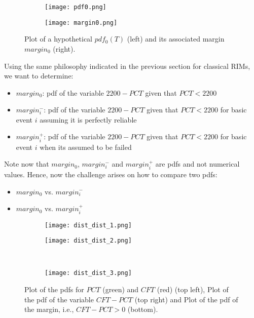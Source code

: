 \begin{figure}
  \centering
  \begin{subfigure}{.5\textwidth}
    \centering
    \centerline{\texttt{[image: pdf0.png]}}
  \end{subfigure}%
  \begin{subfigure}{.5\textwidth}
    \centering
    \centerline{\texttt{[image: margin0.png]}}
  \end{subfigure}
  \caption{Plot of a hypothetical $pdf_0(T)$ (left) and its associated margin $margin_0$ (right).}
  \label{fig:margin0}
\end{figure}
 
Using the same philosophy indicated in the previous section for classical RIMs, we want 
to determine:
\begin{itemize}
  \item $margin_0$: pdf of the variable $2200-PCT$ given that $PCT<2200$
  \item $margin_i^-$: pdf of the variable $2200-PCT$ given that $PCT<2200$ for basic 
                      event $i$ assuming it is perfectly reliable
  \item $margin_i^+$: pdf of the variable $2200-PCT$ given that $PCT<2200$ for basic event 
                      $i$ when its assumed to be failed
\end{itemize}

Note now that $margin_0$, $margin_i^-$ and $margin_i^+$ are pdfs and not numerical values. 
Hence, now the challenge arises on how to compare two pdfs:
\begin{itemize}
  \item $margin_0$ vs. $margin_i^-$
  \item $margin_0$ vs. $margin_i^+$
\end{itemize}

\begin{figure}
  \begin{subfigure}{.5\linewidth}
  \centering
  \texttt{[image: dist\_dist\_1.png]}
  \end{subfigure}%
  \begin{subfigure}{.5\linewidth}
  \centering
  \texttt{[image: dist\_dist\_2.png]}
  \end{subfigure}\\[1ex]
  \begin{subfigure}{\linewidth}
  \centering
  \texttt{[image: dist\_dist\_3.png]}
  \end{subfigure}
  \caption{Plot of the pdfs for $PCT$ (green) and $CFT$ (red) (top left), 
           Plot of the pdf of the variable $CFT-PCT$ (top right) and 
           Plot of the pdf of the margin, i.e., $CFT-PCT>0$ (bottom).}
  \label{fig:dist_dist}
\end{figure}

